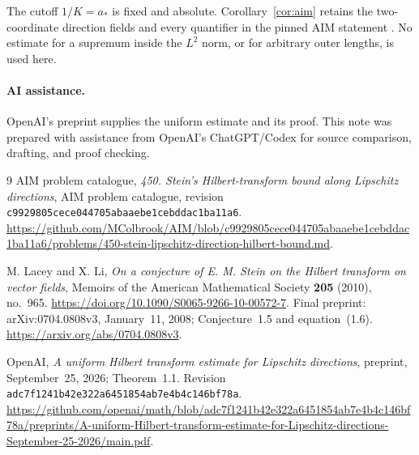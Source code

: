 \documentclass[11pt]{article}
\begin{document}
The cutoff $1/K=a_*$ is fixed and absolute. Corollary~\ref{cor:aim}
retains the two-coordinate direction fields and every quantifier in the
pinned AIM statement \cite{AIM}. No estimate for a supremum inside the
$L^2$ norm, or for arbitrary outer lengths, is used here.

\paragraph{AI assistance.}
OpenAI's preprint \cite{OpenAI} supplies the uniform estimate and its proof.
This note was prepared with assistance from OpenAI's ChatGPT/Codex for
source comparison, drafting, and proof checking.

\begin{thebibliography}{9}
AIM problem catalogue, \emph{450. Stein's Hilbert-transform bound along Lipschitz
directions}, AIM problem catalogue, revision
\texttt{c9929805cece044705abaaebe1cebddac1ba11a6}.
\url{https://github.com/MColbrook/AIM/blob/c9929805cece044705abaaebe1cebddac1ba11a6/problems/450-stein-lipschitz-direction-hilbert-bound.md}.

M. Lacey and X. Li, \emph{On a conjecture of E. M. Stein on the Hilbert
transform on vector fields}, Memoirs of the American Mathematical Society
\textbf{205} (2010), no.~965.
\url{https://doi.org/10.1090/S0065-9266-10-00572-7}.
Final preprint: arXiv:0704.0808v3, January~11, 2008; Conjecture~1.5 and
equation~(1.6). \url{https://arxiv.org/abs/0704.0808v3}.

OpenAI, \emph{A uniform Hilbert transform estimate for Lipschitz directions},
preprint, September~25, 2026; Theorem~1.1. Revision
\texttt{adc7f1241b42e322a6451854ab7e4b4c146bf78a}.
\url{https://github.com/openai/math/blob/adc7f1241b42e322a6451854ab7e4b4c146bf78a/preprints/A-uniform-Hilbert-transform-estimate-for-Lipschitz-directions-September-25-2026/main.pdf}.
\end{thebibliography}
\end{document}
